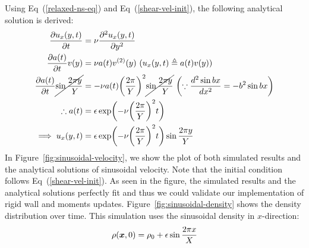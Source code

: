 Using Eq~(\ref{relaxed-ns-eq}) and Eq~(\ref{shear-vel-init}),
the following analytical solution is derived:
\begin{equation}
\begin{aligned}
  \frac{\partial u_x(y, t)}{\partial t} &= \nu \frac{\partial^2 u_x(y, t)}{\partial y^2} \\
  \frac{\partial a(t)}{\partial t}v(y) &= \nu a(t) v^{(2)}(y) ~(u_x(y, t) \triangleq a(t)v(y) ) \\
  \frac{\partial a(t)}{\partial t} \cancel{\sin \frac{2\pi y}{Y}}
  &= -\nu a(t) \biggl(
    \frac{2\pi}{Y}
  \biggr)^2
  \cancel{\sin \frac{2\pi y}{Y}} ~\biggl(\because \frac{d^2 \sin bx}{dx^2} = -b^2 \sin bx
  \biggr) \\
  \therefore a(t) &= \epsilon \exp\biggl(
    -\nu \biggl(
      \frac{2\pi}{Y}
    \biggr)^2 t
  \biggr) \\
  \implies u_x(y, t) &= 
  \epsilon \exp\biggl(
    -\nu \biggl(
      \frac{2\pi}{Y}
    \biggr)^2 t\biggr) \sin \frac{2\pi y}{Y}
\end{aligned}
\label{sinusoidal-vel-analytical-solution}
\end{equation}
In Figure~\ref{fig:sinusoidal-velocity}, we show the plot of both
simulated results and the analytical solutions of sinusoidal velocity.
Note that the initial condition follows Eq~(\ref{shear-vel-init}). 
As seen in the figure, the simulated results and the analytical solutions
perfectly fit and thus we could validate our implementation of
rigid wall and moments updates.
Figure~\ref{fig:sinusoidal-density} shows the density distribution
over time.
This simulation uses the sinusoidal density in $x$-direction:
\begin{equation}
\begin{aligned}
  \rho(\boldsymbol{x}, 0) = \rho_0 + \epsilon \sin \frac{2 \pi x}{X}
\end{aligned}
\end{equation}

